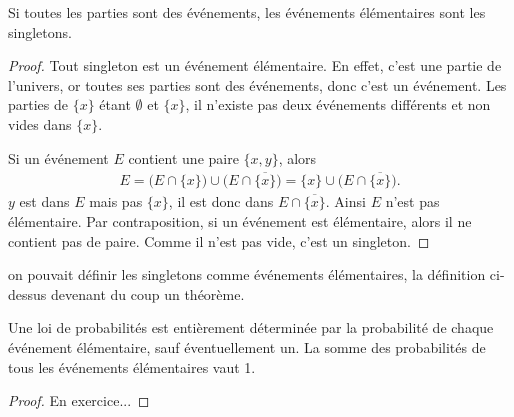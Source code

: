 \begin{theorem}
Si toutes les parties sont des événements, les événements élémentaires sont les singletons.
\end{theorem}
\begin{proof}
Tout singleton est un événement élémentaire. En effet, c'est une partie de l'univers, or toutes ses parties sont des
événements, donc c'est un événement. Les parties de \(\{𝑥\}\) étant \(∅\) et \(\{𝑥\}\), il n'existe pas
deux événements différents et non vides dans \(\{𝑥\}\).

Si un événement \(𝐸\) contient une paire \(\{𝑥,𝑦\}\), alors
\begin{gather*}
𝐸=\bigl(𝐸∩\{𝑥\}\bigr)∪\bigl(𝐸∩\overline{\{𝑥\}}\bigr)=\{𝑥\}∪\bigl(𝐸∩\overline{\{𝑥\}}\bigr).
\end{gather*}
\(𝑦\) est dans \(𝐸\) mais pas \(\{𝑥\}\), il est donc dans \(𝐸∩\overline{\{𝑥\}}\). Ainsi \(𝐸\) n'est pas élémentaire.
Par contraposition, si un événement est élémentaire, alors il ne contient pas de paire. Comme il n'est pas vide, c'est
un singleton.
\end{proof}
\begin{remark}
 on pouvait définir les singletons comme événements élémentaires, la définition ci-dessus
devenant du coup un théorème.
\end{remark}
\begin{theorem}
Une loi de probabilités est entièrement déterminée par la probabilité de chaque événement élémentaire, sauf
éventuellement un.
La somme des probabilités de tous les événements élémentaires vaut 1.
\end{theorem}
\begin{proof}
En exercice...
\end{proof}

